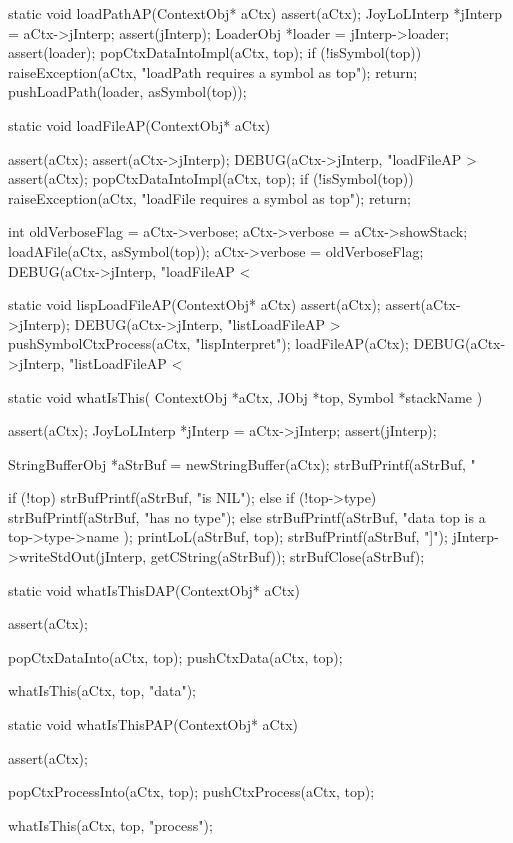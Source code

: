 \startCCode
static void loadPathAP(ContextObj* aCtx) {
  assert(aCtx);
  JoyLoLInterp *jInterp = aCtx->jInterp;
  assert(jInterp);
  LoaderObj *loader = jInterp->loader;
  assert(loader);
  popCtxDataIntoImpl(aCtx, top);
  if (!isSymbol(top)) {
    raiseException(aCtx,
      "loadPath requires a symbol as top");
    return;
  }
  pushLoadPath(loader, asSymbol(top));
}
\stopCCode

\startCCode
static void loadFileAP(ContextObj* aCtx) {
  assert(aCtx);
  assert(aCtx->jInterp);
  DEBUG(aCtx->jInterp, "loadFileAP > %
  assert(aCtx);
  popCtxDataIntoImpl(aCtx, top);
  if (!isSymbol(top)) {
    raiseException(aCtx,
      "loadFile requires a symbol as top");
    return;
  }
  
  int oldVerboseFlag = aCtx->verbose;
  aCtx->verbose = aCtx->showStack;
  loadAFile(aCtx, asSymbol(top));
  aCtx->verbose = oldVerboseFlag;
  DEBUG(aCtx->jInterp, "loadFileAP < %
}
\stopCCode

\startCCode
static void lispLoadFileAP(ContextObj* aCtx) {
  assert(aCtx);
  assert(aCtx->jInterp);
  DEBUG(aCtx->jInterp, "listLoadFileAP > %
  pushSymbolCtxProcess(aCtx, "lispInterpret");
  loadFileAP(aCtx);
  DEBUG(aCtx->jInterp, "listLoadFileAP < %
}
\stopCCode

\startCCode
static void whatIsThis(
  ContextObj *aCtx,
  JObj       *top,
  Symbol     *stackName
) {
  assert(aCtx);
  JoyLoLInterp *jInterp = aCtx->jInterp;
  assert(jInterp);
  
  StringBufferObj *aStrBuf = newStringBuffer(aCtx);
  strBufPrintf(aStrBuf, "%

  if (!top) {
    strBufPrintf(aStrBuf, "is NIL\n");
  } else {
    if (!top->type) {
      strBufPrintf(aStrBuf, "has no type\n");
    } else {
      strBufPrintf(aStrBuf,
        "data top is a %
        top->type->name
      );
      printLoL(aStrBuf, top);
      strBufPrintf(aStrBuf, "]\n");
    }
  }
  jInterp->writeStdOut(jInterp, getCString(aStrBuf));
  strBufClose(aStrBuf);      
}

static void whatIsThisDAP(ContextObj* aCtx) {
  assert(aCtx);
  
  popCtxDataInto(aCtx, top);
  pushCtxData(aCtx, top);
  
  whatIsThis(aCtx, top, "data");
}

static void whatIsThisPAP(ContextObj* aCtx) {
  assert(aCtx);
  
  popCtxProcessInto(aCtx, top);
  pushCtxProcess(aCtx, top);
  
  whatIsThis(aCtx, top, "process");
}
\stopCCode

